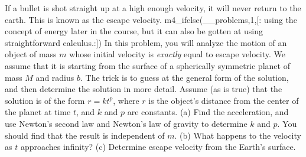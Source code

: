  If a bullet is shot straight up at a high enough
velocity, it will never return to the earth. This is known
as the escape velocity.
m4_ifelse(__problems,1,[:%
using the concept of energy later in the course,
but it can also be gotten at using straightforward calculus.:])
In this problem, you will analyze the motion of an object of
mass $m$ whose initial velocity is \emph{exactly} equal to
escape velocity. We assume that it is starting from the
surface of a spherically symmetric planet of mass $M$ and
radius $b$. The trick is to guess at the general form of the
solution, and then determine the solution in more detail.
Assume (as is true) that the solution is of the form 
$r= kt^p$, where $r$ is the object's distance from the center of
the planet at time $t$, and $k$ and $p$ are constants.\hwendpart
 (a)
Find the acceleration, and use Newton's second law and
Newton's law of gravity to determine $k$ and $p$. You should
find that the result is independent of $m$.\answercheck\hwendpart
 (b) What happens
to the velocity as $t$ approaches infinity?\hwendpart
 (c) Determine
escape velocity from the Earth's surface.\answercheck
